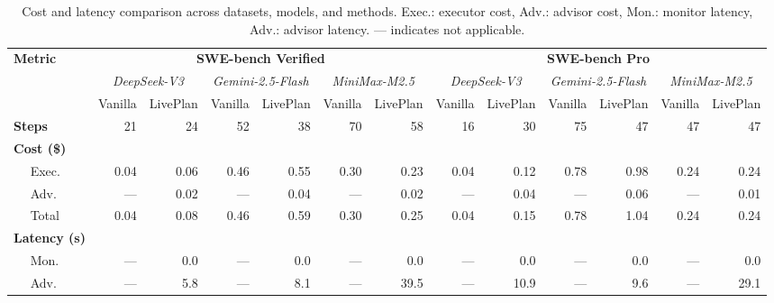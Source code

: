 \begin{table}[h!]
\centering
\small
\setlength{\tabcolsep}{2.5pt}
\caption{Cost and latency comparison across datasets, models, and methods. Exec.: executor cost, Adv.: advisor cost, Mon.: monitor latency, Adv.: advisor latency. --- indicates not applicable.}
\begin{tabular}{l|rrrrrrrrrrrr}
\toprule
\textbf{Metric} & \multicolumn{6}{c}{\textbf{SWE-bench Verified}} & \multicolumn{6}{c}{\textbf{SWE-bench Pro}} \\
 & \multicolumn{2}{c}{\textit{DeepSeek-V3}} & \multicolumn{2}{c}{\textit{Gemini-2.5-Flash}} & \multicolumn{2}{c}{\textit{MiniMax-M2.5}} & \multicolumn{2}{c}{\textit{DeepSeek-V3}} & \multicolumn{2}{c}{\textit{Gemini-2.5-Flash}} & \multicolumn{2}{c}{\textit{MiniMax-M2.5}} \\
 & \scriptsize Vanilla & \scriptsize LivePlan & \scriptsize Vanilla & \scriptsize LivePlan & \scriptsize Vanilla & \scriptsize LivePlan & \scriptsize Vanilla & \scriptsize LivePlan & \scriptsize Vanilla & \scriptsize LivePlan & \scriptsize Vanilla & \scriptsize LivePlan \\
\midrule
\textbf{Steps} & 21 & 24 & 52 & 38 & 70 & 58 & 16 & 30 & 75 & 47 & 47 & 47 \\
\textbf{Cost (\$)} &  &  &  &  &  &  &  &  &  &  &  &  \\
$\quad$ Exec. & 0.04 & 0.06 & 0.46 & 0.55 & 0.30 & 0.23 & 0.04 & 0.12 & 0.78 & 0.98 & 0.24 & 0.24 \\
$\quad$ Adv. & --- & 0.02 & --- & 0.04 & --- & 0.02 & --- & 0.04 & --- & 0.06 & --- & 0.01 \\
$\quad$ Total & 0.04 & 0.08 & 0.46 & 0.59 & 0.30 & 0.25 & 0.04 & 0.15 & 0.78 & 1.04 & 0.24 & 0.24 \\
\cmidrule{1-13}
\textbf{Latency (s)} &  &  &  &  &  &  &  &  &  &  &  &  \\
$\quad$ Mon. & --- & 0.0 & --- & 0.0 & --- & 0.0 & --- & 0.0 & --- & 0.0 & --- & 0.0 \\
$\quad$ Adv. & --- & 5.8 & --- & 8.1 & --- & 39.5 & --- & 10.9 & --- & 9.6 & --- & 29.1 \\
\bottomrule
\end{tabular}
\label{tab:cost_analysis}
\end{table}